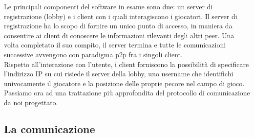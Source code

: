 Le principali componenti del software in esame sono due: un server di 
registrazione (lobby) e i client con i quali interagiscono i giocatori.
Il server di registrazione ha lo scopo di fornire un unico punto di accesso, 
in maniera da consentire ai client di conoscere le informazioni rilevanti degli 
altri peer. Una volta completato il suo compito, il server termina e tutte le 
comunicazioni successive avvengono con paradigma p2p fra i singoli client.
\\
Rispetto all'interazione con l'utente, i client forniscono la possibilità di 
specificare l'indirizzo IP su cui risiede il server della lobby, uno username 
che identifichi univocamente il giocatore e la posizione delle proprie pecore 
nel campo di gioco.
\\
Passiamo ora ad una trattazione più approfondita del protocollo di 
comunicazione da noi progettato.

\subsection{La comunicazione}

